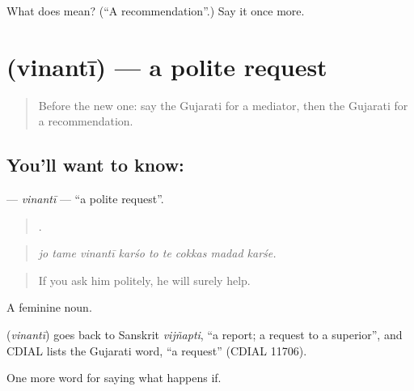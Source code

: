 \begin{tcolorbox}[breakable,colback=teal!4,colframe=teal!35!black,title={Before you move on}]
What does  mean? (\textquotedblleft{}A recommendation\textquotedblright{}.) Say it once more.
\end{tcolorbox}
\section[\texorpdfstring{\gu{વિનંતી} (vinantī)}{વિનંતી (vinantī)}]{ (vinantī) — a polite request}

\label{lesson:GU-C542-vinanti}



\begin{quote}
Before the new one: say the Gujarati for a mediator, then the Gujarati for a recommendation.
\end{quote}

\subsection*{You'll want to know: }
\textbf{} — \emph{vinantī} — \textquotedblleft{}a polite request\textquotedblright{}.

\begin{quote}
        .
\end{quote}

\begin{quote}
\emph{jo tame vinantī karśo to te cokkas madad karśe.}
\end{quote}

\begin{quote}
If you ask him politely, he will surely help.
\end{quote}

A feminine noun.

\begin{cousinweb}
\textbf{} (\emph{vinantī}) goes back to Sanskrit \emph{vijñapti}, \textquotedblleft{}a report; a request to a superior\textquotedblright{}, and CDIAL lists the Gujarati word, \textquotedblleft{}a request\textquotedblright{} (CDIAL 11706).
\end{cousinweb}

\begin{grammarlens}[title={What you've built}]
One more word for saying what happens if.
\end{grammarlens}

